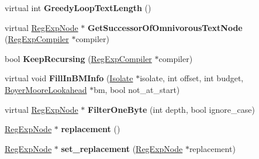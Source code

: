 \begin{DoxyCompactItemize}
\item 
virtual int {\bfseries Greedy\+Loop\+Text\+Length} ()\hypertarget{classv8_1_1internal_1_1_reg_exp_node_aa7f55d54a0ffe45d303773b96ac5ef68}{}\label{classv8_1_1internal_1_1_reg_exp_node_aa7f55d54a0ffe45d303773b96ac5ef68}

\item 
virtual \hyperlink{classv8_1_1internal_1_1_reg_exp_node}{Reg\+Exp\+Node} $\ast$ {\bfseries Get\+Successor\+Of\+Omnivorous\+Text\+Node} (\hyperlink{classv8_1_1internal_1_1_reg_exp_compiler}{Reg\+Exp\+Compiler} $\ast$compiler)\hypertarget{classv8_1_1internal_1_1_reg_exp_node_a3e648c04dbac6ee8045e8aeeafeb905e}{}\label{classv8_1_1internal_1_1_reg_exp_node_a3e648c04dbac6ee8045e8aeeafeb905e}

\item 
bool {\bfseries Keep\+Recursing} (\hyperlink{classv8_1_1internal_1_1_reg_exp_compiler}{Reg\+Exp\+Compiler} $\ast$compiler)\hypertarget{classv8_1_1internal_1_1_reg_exp_node_a409f7d70b3e445a4ba65606759a3fa14}{}\label{classv8_1_1internal_1_1_reg_exp_node_a409f7d70b3e445a4ba65606759a3fa14}

\item 
virtual void {\bfseries Fill\+In\+B\+M\+Info} (\hyperlink{classv8_1_1internal_1_1_isolate}{Isolate} $\ast$isolate, int offset, int budget, \hyperlink{classv8_1_1internal_1_1_boyer_moore_lookahead}{Boyer\+Moore\+Lookahead} $\ast$bm, bool not\+\_\+at\+\_\+start)\hypertarget{classv8_1_1internal_1_1_reg_exp_node_a208754eba18d54c32d3d047c851d52f7}{}\label{classv8_1_1internal_1_1_reg_exp_node_a208754eba18d54c32d3d047c851d52f7}

\item 
virtual \hyperlink{classv8_1_1internal_1_1_reg_exp_node}{Reg\+Exp\+Node} $\ast$ {\bfseries Filter\+One\+Byte} (int depth, bool ignore\+\_\+case)\hypertarget{classv8_1_1internal_1_1_reg_exp_node_ad6a9cf0e0c459207ef4aa12e0fd3b6de}{}\label{classv8_1_1internal_1_1_reg_exp_node_ad6a9cf0e0c459207ef4aa12e0fd3b6de}

\item 
\hyperlink{classv8_1_1internal_1_1_reg_exp_node}{Reg\+Exp\+Node} $\ast$ {\bfseries replacement} ()\hypertarget{classv8_1_1internal_1_1_reg_exp_node_a5106a9e3526079e16cc999ba4bbadad1}{}\label{classv8_1_1internal_1_1_reg_exp_node_a5106a9e3526079e16cc999ba4bbadad1}

\item 
\hyperlink{classv8_1_1internal_1_1_reg_exp_node}{Reg\+Exp\+Node} $\ast$ {\bfseries set\+\_\+replacement} (\hyperlink{classv8_1_1internal_1_1_reg_exp_node}{Reg\+Exp\+Node} $\ast$replacement)\hypertarget{classv8_1_1internal_1_1_reg_exp_node_abe1b803364b2e377ec428bc9920c94ca}{}\label{classv8_1_1internal_1_1_reg_exp_node_abe1b803364b2e377ec428bc9920c94ca}


\end{DoxyCompactItemize}
